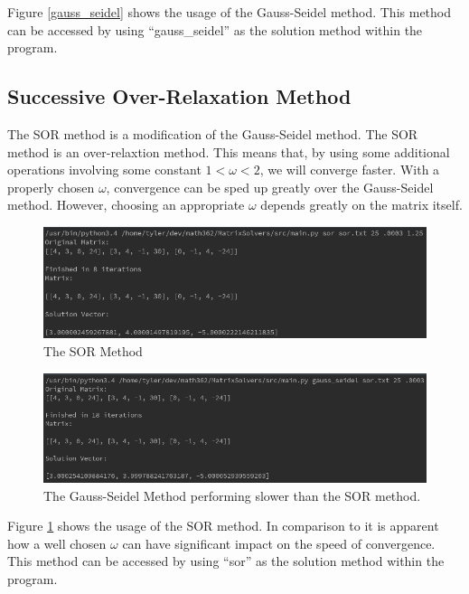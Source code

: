 \documentclass[12pt]{article}
\begin{document}
Figure \ref{gauss_seidel} shows the usage of the Gauss-Seidel method. This method can be accessed by using ``gauss\_seidel''
as the solution method within the program.

\subsection{Successive Over-Relaxation Method}

The SOR method is a modification of the Gauss-Seidel method. The SOR method is 
an over-relaxtion method. This means that, by using some additional operations 
involving some constant $1 < \omega < 2$, we will converge faster. With a 
properly chosen $\omega$, convergence can be sped up greatly over the Gauss-Seidel
method. However, choosing an appropriate $\omega$ depends greatly on the matrix
itself. 

\begin{figure}[H]
\begin{center}
\includegraphics[scale=.5]{sor.png}
\caption{The SOR Method}
\label{sor}
\end{center}
\end{figure}

\begin{figure}[H]
\begin{center}
\includegraphics[scale=.5]{slow_seidel.png}
\caption{The Gauss-Seidel Method performing slower than the SOR method.}
\label{slow_seidel}
\end{center}
\end{figure}

Figure \ref{sor} shows the usage of the SOR method. In comparison to %
it is apparent how a well chosen $\omega$ can have significant impact on the 
speed of convergence. This method can be accessed by using ``sor''
as the solution method within the program.
\end{document}
